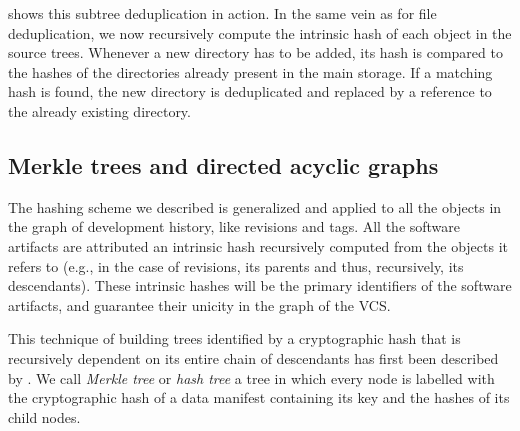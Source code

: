  shows this subtree deduplication in action. In
the same vein as for file deduplication, we now recursively compute the
intrinsic hash of each object in the source trees. Whenever a new directory has
to be added, its hash is compared to the hashes of the directories already
present in the main storage. If a matching hash is found, the new directory is
deduplicated and replaced by a reference to the already existing directory.

\subsection{Merkle trees and directed acyclic graphs}

The hashing scheme we described is generalized and applied to all the objects
in the graph of development history, like revisions and tags. All the software
artifacts are attributed an intrinsic hash recursively computed from the
objects it refers to (e.g., in the case of revisions, its parents and thus,
recursively, its descendants). These intrinsic hashes will be the primary
identifiers of the software artifacts, and guarantee their unicity in the graph
of the \gls{VCS}.

This technique of building trees identified by a cryptographic hash that is
recursively dependent on its entire chain of descendants has first been
described by \textcite{Merkle}. We call \emph{Merkle tree} or \emph{hash
tree} a tree in which every node is labelled with the cryptographic hash of a
data manifest containing its key and the hashes of its child nodes.

